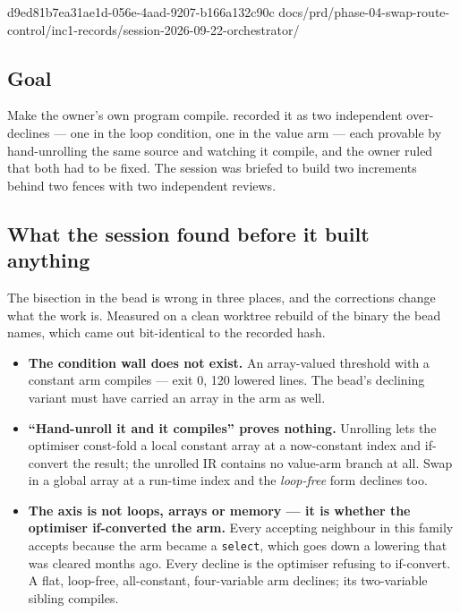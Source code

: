 %
  {d9ed81b7}{ea31ae1d-056e-4aad-9207-b166a132c90c}%
  {docs/prd/phase-04-swap-route-control/inc1-records/session-2026-09-22-orchestrator/}

\subsection*{Goal}
Make the owner's own program compile.  recorded it as two independent over-declines --- one
in the loop condition, one in the value arm --- each provable by hand-unrolling the same source and
watching it compile, and the owner ruled that both had to be fixed. The session was briefed to build
two increments behind two fences with two independent reviews.

\subsection*{What the session found before it built anything}
The bisection in the bead is wrong in three places, and the corrections change what the work is.
Measured on a clean worktree rebuild of the binary the bead names, which came out bit-identical to
the recorded hash.

\begin{itemize}
  \item \textbf{The condition wall does not exist.} An array-valued threshold with a constant arm
        compiles --- exit 0, 120 lowered lines. The bead's declining variant must have carried an
        array in the arm as well.
  \item \textbf{``Hand-unroll it and it compiles'' proves nothing.} Unrolling lets the optimiser
        const-fold a local constant array at a now-constant index and if-convert the result; the
        unrolled IR contains no value-arm branch at all. Swap in a global array at a run-time index
        and the \emph{loop-free} form declines too.
  \item \textbf{The axis is not loops, arrays or memory --- it is whether the optimiser if-converted
        the arm.} Every accepting neighbour in this family accepts because the arm became a
        \texttt{select}, which goes down a lowering that was cleared months ago. Every decline is the
        optimiser refusing to if-convert. A flat, loop-free, all-constant, four-variable arm declines;
        its two-variable sibling compiles.
\end{itemize}

